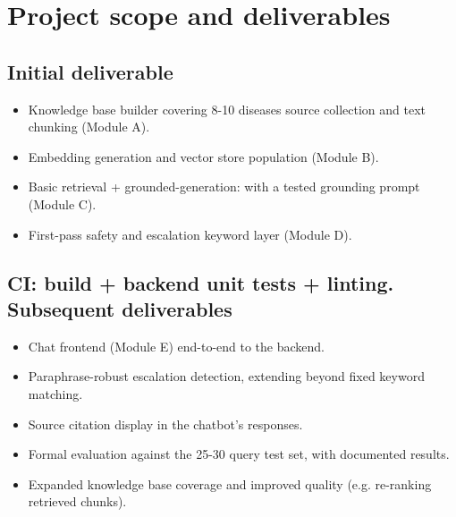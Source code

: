 \documentclass[11pt,a4paper]{article}
\begin{document}
\section{Project scope and deliverables}
\subsection{Initial deliverable}
\begin{itemize}
    \item Knowledge base builder covering 8-10 diseases source collection and text chunking (Module A).
    \item Embedding generation and vector store population (Module B).
    \item Basic retrieval + grounded-generation: with a tested grounding prompt (Module C).
    \item First-pass safety and escalation keyword layer (Module D).
\end{itemize}

\subsection{CI: build + backend unit tests + linting. Subsequent deliverables}
\begin{itemize}
    \item Chat frontend (Module E) end-to-end to the backend.
    \item Paraphrase-robust escalation detection, extending beyond fixed keyword matching.
    \item Source citation display in the chatbot's responses.
    \item Formal evaluation against the 25-30 query test set, with documented results.
    \item Expanded knowledge base coverage and improved quality (e.g. re-ranking retrieved chunks).
\end{itemize}
\end{document}

